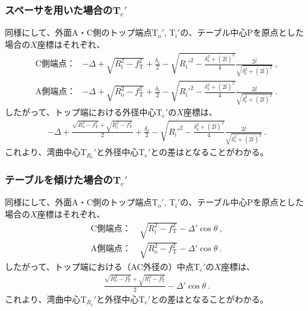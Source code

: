 \subsubsection{スペーサを用いた場合のT\texorpdfstring{$_\mathrm c'$}{c'}}
同様にして、外面A・C側のトップ端点T$_\mathrm o'$, T$_\mathrm i'$の、テーブル中心Pを原点とした場合の$X$座標はそれぞれ、
\begin{align*}
  \text{C側端点：}&
  -\Delta+\sqrt{R_\mathrm i^2-f_\mathrm T^2}+\frac{\delta_\mathrm s}2
  -\sqrt{R_\mathrm i'^2-\frac{\delta_\mathrm s^2+(2\bar l)^2}4}\frac{2\bar l}{\sqrt{\delta_\mathrm s^2+(2\bar l)^2}}\ ,\\
  \text{A側端点：}&
  -\Delta+\sqrt{R_\mathrm o^2-f_\mathrm T^2}+\frac{\delta_\mathrm s}2
  -\sqrt{R_\mathrm i'^2-\frac{\delta_\mathrm s^2+(2\bar l)^2}4}\frac{2\bar l}{\sqrt{\delta_\mathrm s^2+(2\bar l)^2}}\ .
\end{align*}
したがって、トップ端における外径中心T$_\mathrm c'$の$X$座標は、
\begin{align}
  \label{eq:spacerTc}
  -\Delta+\frac{\sqrt{R_\mathrm o^2-f_\mathrm T^2}+\sqrt{R_\mathrm i^2-f_\mathrm T^2}}2
  +\frac{\delta_\mathrm s}2
  -\sqrt{R_\mathrm i'^2-\frac{\delta_\mathrm s^2+(2\bar l)^2}4}
   \frac{2\bar l}{\sqrt{\delta_\mathrm s^2+(2\bar l)^2}}\ .
\end{align}
これより、湾曲中心T$_{R_\mathrm c}'$と外径中心T$_\mathrm c'$との差はとなることがわかる。


\subsubsection{テーブルを傾けた場合のT\texorpdfstring{$_\mathrm c'$}{c'}}
同様にして、外面A・C側のトップ端点T$_\mathrm o'$, T$_\mathrm i'$の、テーブル中心Pを原点とした場合の$X$座標はそれぞれ、
\begin{subequations}
\begin{align}
  \label{eq:tableTi}
  \text{C側端点：}&~
  \sqrt{R_\mathrm i^2-f_\mathrm T^2}-\Delta'\cos\theta\ ,\\
  \text{A側端点：}&~
  \sqrt{R_\mathrm o^2-f_\mathrm T^2}-\Delta'\cos\theta\ .
\end{align}
\end{subequations}
したがって、トップ端における（AC外径の）中点T$_\mathrm c'$の$X$座標は、
\begin{align}
  \label{eq:tableTc}
  \frac{\sqrt{R_\mathrm o^2-f_\mathrm T^2}+\sqrt{R_\mathrm i^2-f_\mathrm T^2}}2
  -\Delta'\cos\theta\ .
\end{align}
これより、湾曲中心T$_{R_\mathrm c}'$と外径中心T$_\mathrm c'$との差はとなることがわかる。




